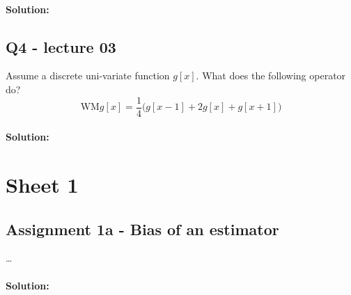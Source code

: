 \paragraph{Solution:} 

\subsection{Q4 - lecture 03} 
Assume a discrete uni-variate function $g[x]$. What does the following operator do?
\begin{equation}
	\text{WM}g[x] = \frac{1}{4}\big( g[x-1] + 2g[x] + g[x+1] \big)
\end{equation}
\paragraph{Solution:} 

\newpage
\section{Sheet 1}

\subsection{Assignment 1a - Bias of an estimator} 
\dots
\paragraph{Solution:} 
